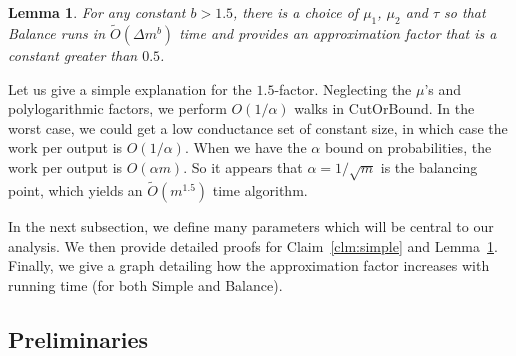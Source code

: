\documentclass[11pt]{article}
\newtheorem{Lem}[theorem]{Lemma}
\newcommand\Balance{{\sc Balance}\xspace}
\newcommand\Simple{{\sc Simple}\xspace}
\newcommand\CutOrBound{{\sc CutOrBound}\xspace}
\newcommand\otilde{\widetilde{O}}
\begin{document}
\begin{Lem} \label{lem:balance}
For any constant $b > 1.5$, there is a choice of $\mu_1$, $\mu_2$ and
$\tau$ so that {\Balance} runs in $\otilde(\Delta m^b)$ time and provides
an approximation factor that is a constant greater than $0.5$.
\end{Lem}

Let us give a simple explanation for the $1.5$-factor. Neglecting the $\mu$'s and
polylogarithmic factors, we perform $O(1/\alpha)$ walks in {\CutOrBound}. In
the worst case, we could get a low conductance set of constant size, in which
case the work per output is $O(1/\alpha)$. When we have the $\alpha$ bound on
probabilities, the work per output is $O(\alpha m)$. So it appears that $\alpha
= 1/\sqrt{m}$ is the balancing point, which yields an $\otilde(m^{1.5})$ time
algorithm.

In the next subsection, we define many parameters
which will be central to our analysis.
We then provide detailed proofs for Claim~\ref{clm:simple} and
Lemma~\ref{lem:balance}. Finally, we give a graph
detailing how the approximation factor increases with
running time (for both {\Simple} and {\Balance}).


\subsection{Preliminaries} \label{app:algo}
\end{document}
